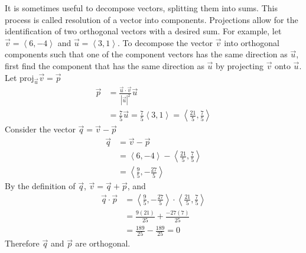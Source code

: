 \documentclass[a4paper]{article}
\newcommand{\la}{\left\langle}
\newcommand{\ra}{\right\rangle}
\newcommand\proj[2]{\text{proj}_{\vec{#1}}{\vec{#2}}}
\begin{document}
It is sometimes useful to decompose vectors, splitting them into sums. This process is called resolution of a vector into components. Projections allow for the identification of two orthogonal vectors with a desired sum. For example, let $\vec{v} = \la 6, -4 \ra$ and $\vec{u} = \la 3, 1 \ra$. To decompose the vector $\vec{v}$ into orthogonal components such that one of the component vectors has the same direction as $\vec{u}$, first find the component that has the same direction as $\vec{u}$ by projecting $\vec{v}$ onto $\vec{u}$. Let $\proj{u}{v} = \vec{p}$
\begin{align*}
    \vec{p} &= \frac{\vec{u} \cdot \vec{v}}{|\vec{u}|^2}\vec{u}\\
    &= \frac{7}{5}\vec{u} = \frac{7}{5} \la 3, 1 \ra = \la \frac{21}{5}, \frac{7}{5} \ra
\end{align*}
Consider the vector $\vec{q} = \vec{v} - \vec{p}$
\begin{align*}
    \vec{q} &= \vec{v} - \vec{p}\\
    &= \la 6, -4 \ra - \la \frac{21}{5}, \frac{7}{5} \ra\\
    &= \la \frac{9}{5}, -\frac{27}{5} \ra
\end{align*}
By the definition of $\vec{q}$, $\vec{v} = \vec{q} + \vec{p}$, and
\begin{align*}
    \vec{q} \cdot \vec{p} &= \la \frac{9}{5}, -\frac{27}{5} \ra \cdot \la \frac{21}{5}, \frac{7}{5} \ra\\
    &= \frac{9(21)}{25} + \frac{-27(7)}{25}\\
    &= \frac{189}{25} - \frac{189}{25} = 0
\end{align*}
Therefore $\vec{q}$ and $\vec{p}$ are orthogonal.
\end{document}
